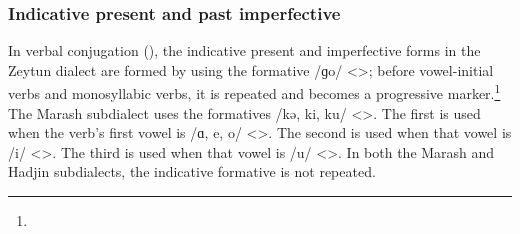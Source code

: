 \subsubsection{Indicative present and past imperfective}


In verbal conjugation (), the indicative present and imperfective forms in the Zeytun dialect are formed by using the formative /ɡo/ <>; before vowel-initial verbs and monosyllabic verbs, it is repeated and becomes a progressive marker.\footnote{} The Marash subdialect uses the formatives /kə, ki, ku/ <>. The first is used when the verb's first vowel is /ɑ, e, o/ <>. The second is used when that vowel is /i/ <>. The third is used when that vowel is /u/ <>. In both the Marash and Hadjin subdialects, the indicative formative is not repeated. 


